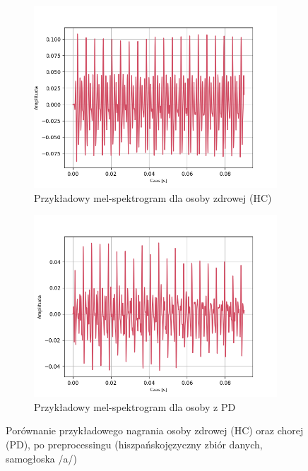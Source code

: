 \begin{figure}[ht]
    \centering
    \begin{subfigure}{0.49\textwidth}
        \centering
        \includegraphics[width=\textwidth]{./img/recordings/HC_a}
        \caption{Przykładowy mel-spektrogram dla osoby zdrowej (HC)\@}
        \label{fig:recording_HC}
    \end{subfigure}
    \begin{subfigure}{0.49\textwidth}
        \centering
        \includegraphics[width=\textwidth]{./img/recordings/PD_a}
        \caption{Przykładowy mel-spektrogram dla osoby z PD\@}
        \label{fig:recording_PD}
    \end{subfigure}

    \caption{Porównanie przykładowego nagrania osoby zdrowej (HC) oraz chorej (PD), po preprocessingu (hiszpańskojęzyczny zbiór danych, samogłoska /a/)}
    \label{fig:recordings}
\end{figure}

